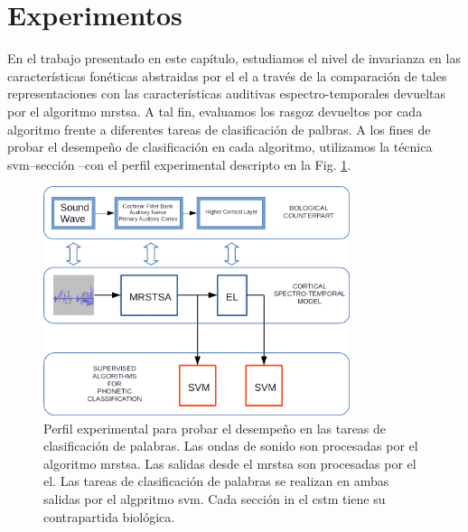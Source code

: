 



\section{Experimentos}

En el trabajo presentado en este capítulo, estudiamos el nivel de invarianza en las características fonéticas abstraidas por el \gls{el} a través de la comparación de tales representaciones con las características auditivas espectro-temporales devueltas por el algoritmo \gls{mrstsa}. A tal fin, evaluamos los rasgoz devueltos por cada algoritmo frente a diferentes tareas de clasificación de palbras. A los fines de probar el desempeño de clasificación en cada algoritmo, utilizamos la técnica \gls{svm}--sección --con el perfil experimental descripto en la Fig. \ref{fig:Experiment}.

\begin{figure}[h!]
    \centering
    \includegraphics[width=0.8\textwidth]{Experiment.png}
    \caption{Perfil experimental para probar el desempeño en las tareas de clasificación de palabras.
	    Las ondas de sonido son procesadas por el algoritmo \gls{mrstsa}.
    Las salidas desde el \gls{mrstsa} son procesadas por el \gls{el}.
    Las tareas de clasificación de palabras se realizan en ambas salidas por el algpritmo \gls{svm}.
    Cada sección in el \gls{cstm} tiene su contrapartida biológica.}
    \label{fig:Experiment}
\end{figure}



